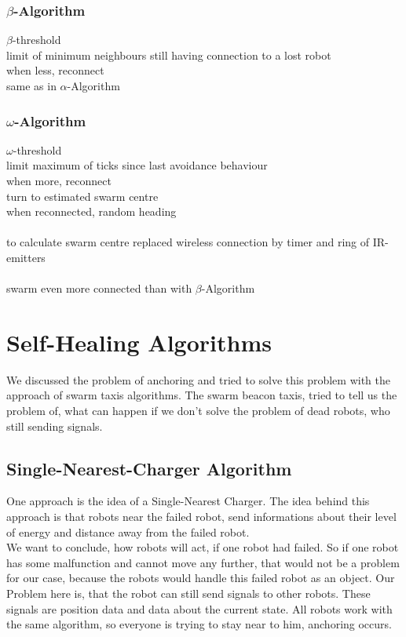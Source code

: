 \documentclass[
	a4paper,
	article,
	pagesize,
	pdftex,
	12pt,
	english,
	fleqn,
	final,
	]{scrartcl}
\begin{document}
\subsubsection{$\beta$-Algorithm}
$\beta$-threshold\\
limit of minimum neighbours still having connection to a lost robot\\
when less, reconnect\\
same as in $\alpha$-Algorithm

\subsubsection{$\omega$-Algorithm}
$\omega$-threshold\\
limit maximum of ticks since last avoidance behaviour\\
when more, reconnect\\
turn to estimated swarm centre\\
when reconnected, random heading\\
\ \\
to calculate swarm centre replaced wireless connection by timer and ring of IR-emitters\\
\ \\
swarm even more connected than with $\beta$-Algorithm
\color{black}

\section{Self-Healing Algorithms}
We discussed the problem of anchoring and tried to solve this problem with the approach of swarm taxis algorithms. The swarm beacon taxis, tried to tell us the problem of, what can happen if we don't solve the problem of dead robots, who still sending signals.

\subsection{Single-Nearest-Charger Algorithm}
One approach is the idea of a Single-Nearest Charger.
The idea behind this approach is that robots near the failed robot, send informations about their level of energy and distance away from the failed robot.\\
We want to conclude, how robots will act, if one robot had failed. So if one robot has some malfunction and cannot move any further, that would not be a problem for our case, because the robots would handle this failed robot as an object. Our Problem here is, that the robot can still send signals to other robots. These signals are position data and data about the current state. All robots work with the same algorithm, so everyone is trying to stay near to him, anchoring occurs. \\
\end{document}
